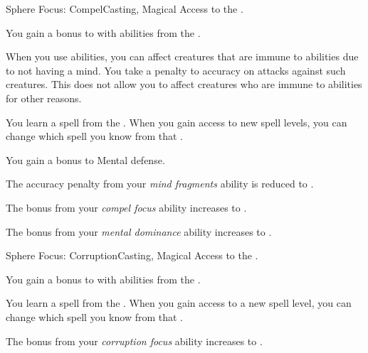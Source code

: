     \begin{feat}{Sphere Focus: Compel}{Casting, Magical}
        \featpre Access to the  .

         You gain a  bonus to  with abilities from the  .

         When you use  abilities, you can affect creatures that are immune to  abilities due to not having a mind.
        You take a  penalty to accuracy on attacks against such creatures.
        This does not allow you to affect creatures who are immune to  abilities for other reasons.

         You learn a spell from the  .
        When you gain access to new spell levels, you can change which spell you know from that .

         You gain a  bonus to Mental defense.

         The accuracy penalty from your \textit{mind fragments} ability is reduced to .

         The bonus from your \textit{compel focus} ability increases to .

         The bonus from your \textit{mental dominance} ability increases to .
    \end{feat}

    \begin{feat}{Sphere Focus: Corruption}{Casting, Magical}
        \featpre Access to the  .

         You gain a  bonus to  with abilities from the  .

         You learn a spell from the  .
        When you gain access to a new spell level, you can change which spell you know from that .

         The bonus from your \textit{corruption focus} ability increases to .
    \end{feat}

